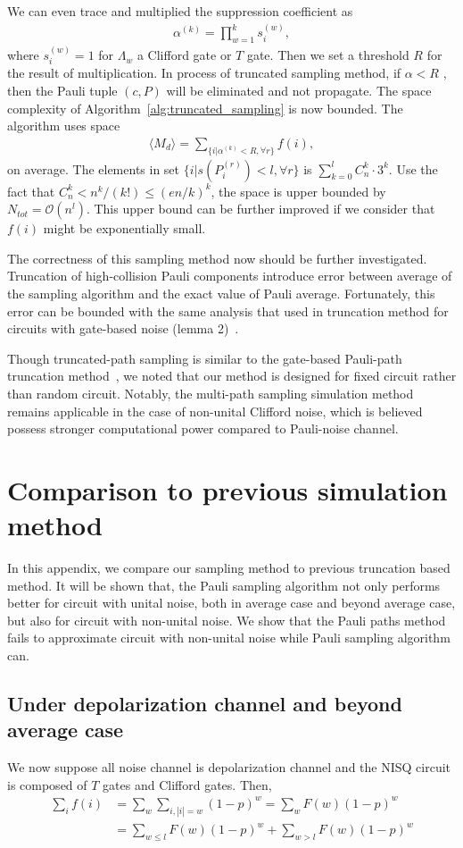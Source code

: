 \documentclass[aps,%
twocolumn,%
floatfix,%
pra,%
amsfonts,%
longbibliography,%
groupedaddress,%
superscriptaddress]{revtex4-2}%
\newcommand{\1}{\mathbbm{1}}
\begin{document}
We can even trace and multiplied the suppression coefficient as
\begin{align}
    \alpha^{(k)} = \prod_{w = 1}^{k}s_i^{(w)},
\end{align}
where $s_i^{(w)} = 1$ for $\Lambda_w$ a Clifford gate or $T$ gate. 
Then we set a threshold $R$ for the result of multiplication.
In process of truncated sampling method, if $\alpha < R$ , then the Pauli tuple $(c,P)$ will be eliminated and not propagate.
The space complexity of Algorithm~\ref{alg:truncated_sampling} is now bounded. The algorithm uses space 
\begin{align}
    \langle M_d \rangle = \sum_{\{i|\alpha^{(k)}<R, \forall r\}} f(i), 
\end{align} 
on average. The elements in set $\{i|s(P_i^{(r)})<l, \forall r\}$ is $\sum_{k =0}^l C_n^k \cdot 3^k$. Use the fact that $C_n^k <n^k/(k!)\leq (en/k)^k$, the space is upper bounded by $N_{tot} = \mathcal{O}(n^l)$.    This upper bound can be further improved if we consider that $f(i)$ might be exponentially small.

The correctness of this sampling method now should be further investigated. Truncation of high-collision Pauli components introduce error between average of the sampling algorithm and the exact value of Pauli average. Fortunately, this error can be bounded with the same analysis that used in truncation method for circuits with gate-based noise (lemma 2)~\cite{schuster2024polynomial}.   

Though truncated-path sampling is similar to the gate-based Pauli-path truncation method~\cite{schuster2024polynomial}, we noted that our method is designed for fixed circuit rather than random circuit. 
Notably, the multi-path sampling simulation method remains applicable in the case of non-unital Clifford noise, which is believed possess stronger computational power compared to Pauli-noise channel.
\section{Comparison to previous simulation method}
\label{app:comparison}
In this appendix, we compare our sampling method to previous truncation based method. It will be shown that, the Pauli sampling algorithm not only performs better for circuit with unital noise, both in average case and beyond average case, but also for circuit with non-unital noise. 
We show that the Pauli paths method fails to approximate circuit with non-unital noise while Pauli sampling algorithm can.
\subsection{Under depolarization channel and beyond average case}
We now suppose all noise channel is depolarization channel and the NISQ circuit is composed of $T$ gates and Clifford gates. Then,
\begin{align}
    \sum_i f(i) &= \sum_{w}\sum_{i,|i| = w}(1 - p)^w = \sum_w F(w) (1 - p)^w\\
    & = \sum_{w \leq l} F(w)(1 - p)^w + \sum_{w > l} F(w) (1 - p)^w
\end{align}
\end{document}
